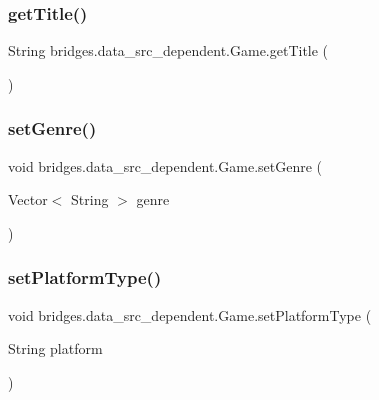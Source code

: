 \subsubsection{\texorpdfstring{get\+Title()}{getTitle()}}
{\footnotesize\ttfamily String bridges.\+data\+\_\+src\+\_\+dependent.\+Game.\+get\+Title (\begin{DoxyParamCaption}{ }\end{DoxyParamCaption})}

\hypertarget{classbridges_1_1data__src__dependent_1_1_game_ab3c9d9cd9f0acdd7bdc6ea7e1b140868}{}\label{classbridges_1_1data__src__dependent_1_1_game_ab3c9d9cd9f0acdd7bdc6ea7e1b140868} 
\subsubsection{\texorpdfstring{set\+Genre()}{setGenre()}}
{\footnotesize\ttfamily void bridges.\+data\+\_\+src\+\_\+dependent.\+Game.\+set\+Genre (\begin{DoxyParamCaption}\item[{Vector$<$ String $>$}]{genre }\end{DoxyParamCaption})}

\hypertarget{classbridges_1_1data__src__dependent_1_1_game_ab4d51e07186a9228c50210cf661304c7}{}\label{classbridges_1_1data__src__dependent_1_1_game_ab4d51e07186a9228c50210cf661304c7} 
\subsubsection{\texorpdfstring{set\+Platform\+Type()}{setPlatformType()}}
{\footnotesize\ttfamily void bridges.\+data\+\_\+src\+\_\+dependent.\+Game.\+set\+Platform\+Type (\begin{DoxyParamCaption}\item[{String}]{platform }\end{DoxyParamCaption})}

\hypertarget{classbridges_1_1data__src__dependent_1_1_game_ab59c6ea5ee2721dcca2246e8e287154f}{}\label{classbridges_1_1data__src__dependent_1_1_game_ab59c6ea5ee2721dcca2246e8e287154f} 

